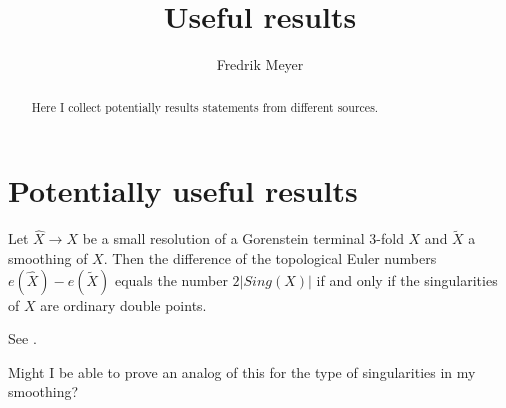 \documentclass[11pt, english]{article}
\begin{document}
\title{Useful results}
\author{Fredrik Meyer}
\maketitle 

\begin{abstract}
 Here I collect potentially results statements from different sources.
\end{abstract}

\section{Potentially useful results}

\begin{prop}
Let $\widehat X \to X$ be a small resolution of a Gorenstein terminal 3-fold $X$ and $\widetilde X$ a smoothing of $X$. Then the difference of the topological Euler numbers $e(\widehat X) - e(\widetilde X)$ equals the number $2\lvert Sing(X) \rvert$ if and only if the singularities of $X$ are ordinary double points.
\end{prop}
See \cite{wang_connectedness}.

Might I be able to prove an analog of this for the type of singularities in my smoothing?



\end{document}
